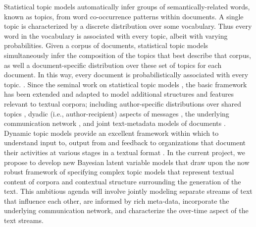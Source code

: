 Statistical topic models automatically infer groups of semantically-related words, known as topics, from word co-occurrence patterns within documents. A single topic is characterized by a discrete distribution over some vocabulary. Thus every word in the vocabulary is associated with every topic, albeit with varying probabilities. Given a corpus of documents, statistical topic models simultaneously infer the composition of the topics that best describe that corpus, as well a document-specific distribution over these set of topics for each document. In this way, every document is probabilistically associated with every topic.  \cite{Blei2010}. Since the seminal work on statistical topic models \cite{Blei2003}, the basic framework has been extended and adapted to model additional structures and features relevant to textual corpora; including author-specific distributions over shared topics \cite{Steyvers2004}, dyadic (i.e., author-recipient) aspects of messages \cite{McCallum2005}, the underlying communication network \cite{Krafft2012}, and joint text-metadata models of documents \cite{Mimno2008}. Dynamic topic models \cite{Blei2006} provide an excellent framework within which to understand input to, output from and feedback to organizations that document their activities at various stages in a textual format . In the current project, we propose to develop new Bayesian latent variable models that draw upon the now robust framework of specifying complex topic models that represent textual content of corpora and contextual structure surrounding the generation of the text. This ambitious agenda will involve jointly modeling separate streams of text that influence each other, are informed by rich meta-data, incorporate the underlying communication network, and characterize the over-time aspect of the text streams.




